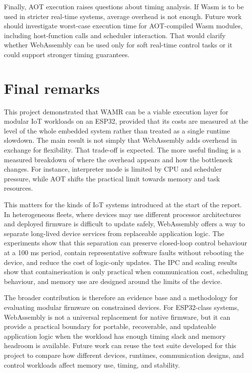 \documentclass[12pt, a4paper]{report}
\begin{document}
Finally, AOT execution raises questions about timing analysis. If Wasm is to be used in stricter real-time systems, average overhead is not enough. Future work should investigate worst-case execution time for AOT-compiled Wasm modules, including host-function calls and scheduler interaction. That would clarify whether WebAssembly can be used only for soft real-time control tasks or it could support stronger timing guarantees.

\section{Final remarks}

This project demonstrated that WAMR can be a viable execution layer for modular IoT workloads on an ESP32, provided that its costs are measured at the level of the whole embedded system rather than treated as a single runtime slowdown. The main result is not simply that WebAssembly adds overhead in exchange for flexibility. That trade-off is expected. The more useful finding is a measured breakdown of where the overhead appears and how the bottleneck changes. For instance, interpreter mode is limited by CPU and scheduler pressure, while AOT shifts the practical limit towards memory and task resources.

This matters for the kinds of IoT systems introduced at the start of the report. In heterogeneous fleets, where devices may use different processor architectures and deployed firmware is difficult to update safely, WebAssembly offers a way to separate long-lived device services from replaceable application logic. The experiments show that this separation can preserve closed-loop control behaviour at a 100 ms period, contain representative software faults without rebooting the device, and reduce the cost of logic-only updates. The IPC and scaling results show that containerisation is only practical when communication cost, scheduling behaviour, and memory use are designed around the limits of the device.

The broader contribution is therefore an evidence base and a methodology for evaluating modular firmware on constrained devices. For ESP32-class systems, WebAssembly is not a universal replacement for native firmware, but it can provide a practical boundary for portable, recoverable, and updateable application logic when the workload has enough timing slack and memory headroom is available. Future work can reuse the test suite developed for this project to compare how different devices, runtimes, communication designs, and control workloads affect memory use, timing, and stability.
\end{document}
